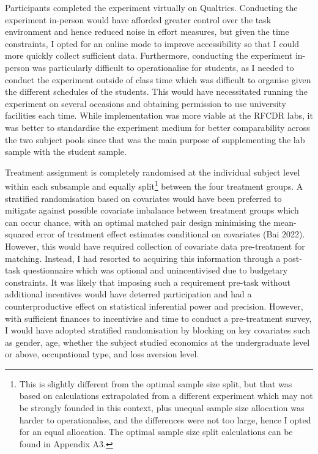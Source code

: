 \documentclass[
  12,
  letterpaper,
  DIV=11,
  numbers=noendperiod]{scrartcl}
\begin{document}
Participants completed the experiment virtually on Qualtrics. Conducting
the experiment in-person would have afforded greater control over the
task environment and hence reduced noise in effort measures, but given
the time constraints, I opted for an online mode to improve
accessibility so that I could more quickly collect sufficient data.
Furthermore, conducting the experiment in-person was particularly
difficult to operationalise for students, as I needed to conduct the
experiment outside of class time which was difficult to organise given
the different schedules of the students. This would have necessitated
running the experiment on several occasions and obtaining permission to
use university facilities each time. While implementation was more
viable at the RFCDR labs, it was better to standardise the experiment
medium for better comparability across the two subject pools since that
was the main purpose of supplementing the lab sample with the student
sample.

Treatment assignment is completely randomised at the individual subject
level within each subsample and equally split\footnote{This is slightly
  different from the optimal sample size split, but that was based on
  calculations extrapolated from a different experiment which may not be
  strongly founded in this context, plus unequal sample size allocation
  was harder to operationalise, and the differences were not too large,
  hence I opted for an equal allocation. The optimal sample size split
  calculations can be found in Appendix A3.} between the four treatment
groups. A stratified randomisation based on covariates would have been
preferred to mitigate against possible covariate imbalance between
treatment groups which can occur chance, with an optimal matched pair
design minimising the mean-squared error of treatment effect estimates
conditional on covariates (Bai 2022). However, this would have required
collection of covariate data pre-treatment for matching. Instead, I had
resorted to acquiring this information through a post-task questionnaire
which was optional and unincentivised due to budgetary constraints. It
was likely that imposing such a requirement pre-task without additional
incentives would have deterred participation and had a counterproductive
effect on statistical inferential power and precision. However, with
sufficient finances to incentivise and time to conduct a pre-treatment
survey, I would have adopted stratified randomisation by blocking on key
covariates such as gender, age, whether the subject studied economics at
the undergraduate level or above, occupational type, and loss aversion
level.
\end{document}
